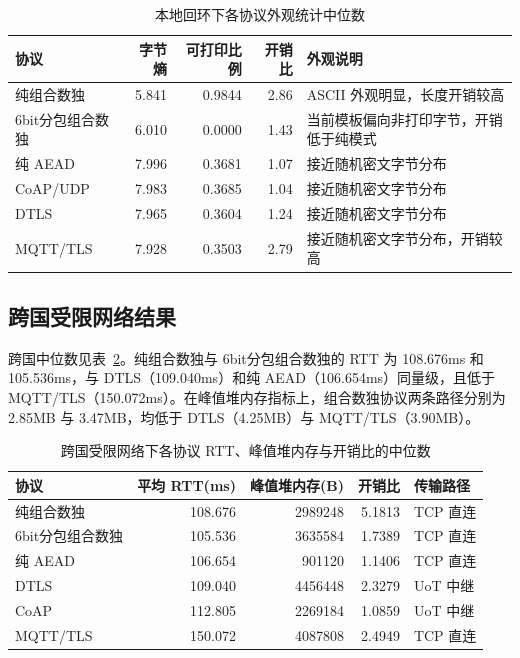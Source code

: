 \begin{table}[H]
\centering
\scriptsize
\caption{本地回环下各协议外观统计中位数}
\label{tab:c4-local-appearance}
\begin{tabularx}{\linewidth}{>{\raggedright\arraybackslash}p{2.8cm}rrr>{\raggedright\arraybackslash}X}
\toprule
协议 & 字节熵 & 可打印比例 & 开销比 & 外观说明 \\
\midrule
纯组合数独 & 5.841 & 0.9844 & 2.86 & ASCII 外观明显，长度开销较高 \\
6bit分包组合数独 & 6.010 & 0.0000 & 1.43 & 当前模板偏向非打印字节，开销低于纯模式 \\
纯 AEAD & 7.996 & 0.3681 & 1.07 & 接近随机密文字节分布 \\
CoAP/UDP & 7.983 & 0.3685 & 1.04 & 接近随机密文字节分布 \\
DTLS & 7.965 & 0.3604 & 1.24 & 接近随机密文字节分布 \\
MQTT/TLS & 7.928 & 0.3503 & 2.79 & 接近随机密文字节分布，开销较高 \\
\bottomrule
\end{tabularx}
\end{table}

\subsection{跨国受限网络结果}
跨国中位数见表~\ref{tab:c4-cross-region-main}。纯组合数独与 6bit分包组合数独的 RTT 为 108.676ms 和 105.536ms，与 DTLS（109.040ms）和纯 AEAD（106.654ms）同量级，且低于 MQTT/TLS（150.072ms）。在峰值堆内存指标上，组合数独协议两条路径分别为 2.85MB 与 3.47MB，均低于 DTLS（4.25MB）与 MQTT/TLS（3.90MB）。

\begin{table}[H]
\centering
\small
\caption{跨国受限网络下各协议 RTT、峰值堆内存与开销比的中位数}
\label{tab:c4-cross-region-main}
\begin{tabular}{lrrrl}
\toprule
协议 & 平均 RTT(ms) & 峰值堆内存(B) & 开销比 & 传输路径 \\
\midrule
纯组合数独 & 108.676 & 2989248 & 5.1813 & TCP 直连 \\
6bit分包组合数独 & 105.536 & 3635584 & 1.7389 & TCP 直连 \\
纯 AEAD & 106.654 & 901120 & 1.1406 & TCP 直连 \\
DTLS & 109.040 & 4456448 & 2.3279 & UoT 中继 \\
CoAP & 112.805 & 2269184 & 1.0859 & UoT 中继 \\
MQTT/TLS & 150.072 & 4087808 & 2.4949 & TCP 直连 \\
\bottomrule
\end{tabular}
\end{table}

